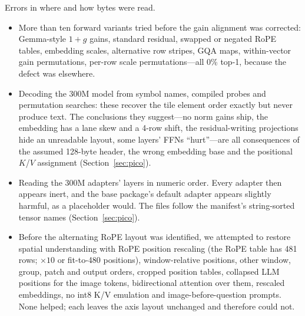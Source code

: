 \documentclass[11pt,reqno]{amsart}
\makeatletter
\renewcommand\paragraph{\@startsection{paragraph}{4}\z@{.6\linespacing\@plus.2\linespacing}{-\fontdimen2\font}{\normalfont\bfseries}}
\theoremstyle{definition}
\makeatother
\begin{document}
\paragraph{Parsing and alignment.} Errors in where and how bytes were read.
\begin{itemize}
\item More than ten forward variants tried before the gain alignment was corrected: Gemma-style $1{+}g$ gains, standard residual, swapped or negated RoPE tables, embedding scales, alternative row stripes, GQA maps, within-vector gain permutations, per-row scale permutations---all 0\% top-1, because the defect was elsewhere.
\item Decoding the 300M model from symbol names, compiled probes and permutation searches: these recover the tile element order exactly but never produce text. The conclusions they suggest---no norm gains ship, the embedding has a lane skew and a 4-row shift, the residual-writing projections hide an unreadable layout, some layers' FFNs ``hurt''---are all consequences of the assumed 128-byte header, the wrong embedding base and the positional $K$/$V$ assignment (Section~\ref{sec:pico}).
\item Reading the 300M adapters' layers in numeric order. Every adapter then appears inert, and the base package's default adapter appears slightly harmful, as a placeholder would. The files follow the manifest's string-sorted tensor names (Section~\ref{sec:pico}).
\item Before the alternating RoPE layout was identified, we attempted to restore spatial understanding with RoPE position rescaling (the RoPE table has 481 rows; $\times10$ or fit-to-480 positions), window-relative positions, other window, group, patch and output orders, cropped position tables, collapsed LLM positions for the image tokens, bidirectional attention over them, rescaled embeddings, no int8 K/V emulation and image-before-question prompts. None helped; each leaves the axis layout unchanged and therefore could not.
\end{itemize}
\end{document}

